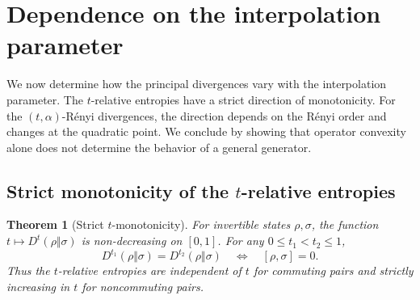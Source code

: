 \documentclass[11pt]{article}
\newtheorem{theorem}[theorem]{Theorem}
\theoremstyle{remark}
\newcommand{\1}{\mathbbm{1}}
\begin{document}
\section{Dependence on the interpolation parameter}
\label{rw:sec:t-monotonicity}

We now determine how the principal divergences vary with the
interpolation parameter.  The $t$-relative entropies have a strict
direction of monotonicity.  For the $(t,\alpha)$-R\'enyi divergences,
the direction depends on the R\'enyi order and changes at the
quadratic point.  We conclude by showing that operator convexity alone
does not determine the behavior of a general generator.

\subsection{Strict monotonicity of the
\texorpdfstring{$t$}{t}-relative entropies}
\label{rw:subsec:Dt-monotonicity}

\begin{theorem}[Strict $t$-monotonicity]
\label{rw:thm:Dt-strict-monotonicity}
For invertible states $\rho,\sigma$, the function
$t\mapsto D^t(\rho\Vert\sigma)$ is non-decreasing on $[0,1]$.
For any $0\leq t_1<t_2\leq1$,
\begin{equation}
 D^{t_1}(\rho\Vert\sigma)=D^{t_2}(\rho\Vert\sigma)
 \quad\Longleftrightarrow\quad [\rho,\sigma]=0.
 \label{rw:eq:Dt-strict-equality}
\end{equation}
Thus the $t$-relative entropies are independent of $t$ for commuting
pairs and strictly increasing in $t$ for noncommuting pairs.
\end{theorem}
\end{document}
